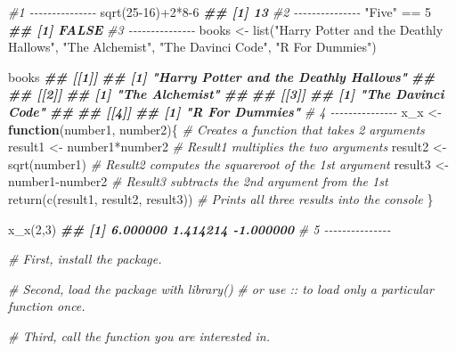 \documentclass[
]{book}
\newenvironment{Shaded}{\begin{snugshade}}{\end{snugshade}}
\newcommand{\CommentTok}[1]{\textcolor[rgb]{0.56,0.35,0.01}{\textit{#1}}}
\newcommand{\ControlFlowTok}[1]{\textcolor[rgb]{0.13,0.29,0.53}{\textbf{#1}}}
\newcommand{\DecValTok}[1]{\textcolor[rgb]{0.00,0.00,0.81}{#1}}
\newcommand{\DocumentationTok}[1]{\textcolor[rgb]{0.56,0.35,0.01}{\textbf{\textit{#1}}}}
\newcommand{\FunctionTok}[1]{\textcolor[rgb]{0.00,0.00,0.00}{#1}}
\newcommand{\NormalTok}[1]{#1}
\newcommand{\OtherTok}[1]{\textcolor[rgb]{0.56,0.35,0.01}{#1}}
\newcommand{\SpecialCharTok}[1]{\textcolor[rgb]{0.00,0.00,0.00}{#1}}
\newcommand{\StringTok}[1]{\textcolor[rgb]{0.31,0.60,0.02}{#1}}
\begin{document}
\begin{Shaded}
\begin{Highlighting}[]
\CommentTok{\#1 {-}{-}{-}{-}{-}{-}{-}{-}{-}{-}{-}{-}{-}{-}{-}}
\FunctionTok{sqrt}\NormalTok{(}\DecValTok{25{-}16}\NormalTok{)}\SpecialCharTok{+}\DecValTok{2}\SpecialCharTok{*}\DecValTok{8{-}6}
\DocumentationTok{\#\# [1] 13}
\CommentTok{\#2 {-}{-}{-}{-}{-}{-}{-}{-}{-}{-}{-}{-}{-}{-}{-}}
\StringTok{"Five"} \SpecialCharTok{==} \DecValTok{5}
\DocumentationTok{\#\# [1] FALSE}
\CommentTok{\#3 {-}{-}{-}{-}{-}{-}{-}{-}{-}{-}{-}{-}{-}{-}{-}}
\NormalTok{books }\OtherTok{\textless{}{-}} \FunctionTok{list}\NormalTok{(}\StringTok{"Harry Potter and the Deathly Hallows"}\NormalTok{,}
              \StringTok{"The Alchemist"}\NormalTok{,}
              \StringTok{"The Davinci Code"}\NormalTok{,}
              \StringTok{"R For Dummies"}\NormalTok{)}

\NormalTok{books}
\DocumentationTok{\#\# [[1]]}
\DocumentationTok{\#\# [1] "Harry Potter and the Deathly Hallows"}
\DocumentationTok{\#\# }
\DocumentationTok{\#\# [[2]]}
\DocumentationTok{\#\# [1] "The Alchemist"}
\DocumentationTok{\#\# }
\DocumentationTok{\#\# [[3]]}
\DocumentationTok{\#\# [1] "The Davinci Code"}
\DocumentationTok{\#\# }
\DocumentationTok{\#\# [[4]]}
\DocumentationTok{\#\# [1] "R For Dummies"}
\CommentTok{\# 4 {-}{-}{-}{-}{-}{-}{-}{-}{-}{-}{-}{-}{-}{-}{-}}
\NormalTok{x\_x }\OtherTok{\textless{}{-}} \ControlFlowTok{function}\NormalTok{(number1, number2)\{       }\CommentTok{\# Creates a function that takes 2 arguments}
\NormalTok{  result1 }\OtherTok{\textless{}{-}}\NormalTok{ number1}\SpecialCharTok{*}\NormalTok{number2             }\CommentTok{\# Result1 multiplies the two arguments}
\NormalTok{  result2 }\OtherTok{\textless{}{-}} \FunctionTok{sqrt}\NormalTok{(number1)               }\CommentTok{\# Result2 computes the squareroot of the 1st argument}
\NormalTok{  result3 }\OtherTok{\textless{}{-}}\NormalTok{ number1}\SpecialCharTok{{-}}\NormalTok{number2             }\CommentTok{\# Result3 subtracts the 2nd argument from the 1st}
  \FunctionTok{return}\NormalTok{(}\FunctionTok{c}\NormalTok{(result1, result2, result3))   }\CommentTok{\# Prints all three results into the console}
\NormalTok{\} }

\FunctionTok{x\_x}\NormalTok{(}\DecValTok{2}\NormalTok{,}\DecValTok{3}\NormalTok{)}
\DocumentationTok{\#\# [1]  6.000000  1.414214 {-}1.000000}
\CommentTok{\# 5 {-}{-}{-}{-}{-}{-}{-}{-}{-}{-}{-}{-}{-}{-}{-}}

\CommentTok{\# First, install the package.}

\CommentTok{\# Second, load the package with \textquotesingle{}library()\textquotesingle{}}
\CommentTok{\#         or use \textquotesingle{}::\textquotesingle{} to load only a particular function once.}

\CommentTok{\# Third, call the function you are interested in.}
\end{Highlighting}
\end{Shaded}


  
\end{document}

